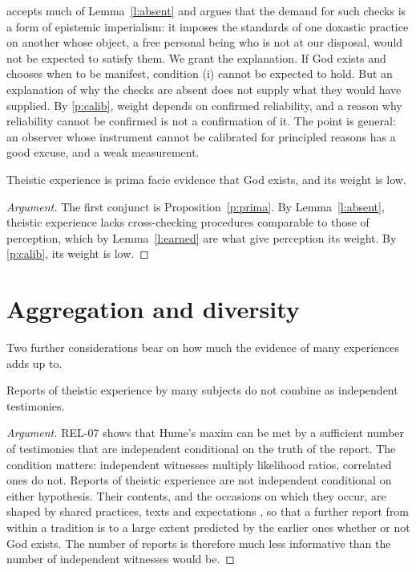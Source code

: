 \documentclass{situationist-preprint}
\begin{document}
\citet{Alston1991} accepts much of Lemma~\ref{l:absent} and argues that the demand for such checks is a form of epistemic imperialism: it imposes the standards of one doxastic practice on another whose object, a free personal being who is not at our disposal, would not be expected to satisfy them. We grant the explanation. If God exists and chooses when to be manifest, condition (i) cannot be expected to hold. But an explanation of why the checks are absent does not supply what they would have supplied. By \ref{p:calib}, weight depends on confirmed reliability, and a reason why reliability cannot be confirmed is not a confirmation of it. The point is general: an observer whose instrument cannot be calibrated for principled reasons has a good excuse, and a weak measurement.

\begin{theorem}\label{t:main}
Theistic experience is prima facie evidence that God exists, and its weight is low.
\end{theorem}

\begin{proof}[Argument]
The first conjunct is Proposition~\ref{p:prima}. By Lemma~\ref{l:absent}, theistic experience lacks cross-checking procedures comparable to those of perception, which by Lemma~\ref{l:earned} are what give perception its weight. By \ref{p:calib}, its weight is low.
\end{proof}

\section{Aggregation and diversity}

Two further considerations bear on how much the evidence of many experiences adds up to.

\begin{proposition}\label{p:agg}
Reports of theistic experience by many subjects do not combine as independent testimonies.
\end{proposition}

\begin{proof}[Argument]
REL-07 shows that Hume's maxim can be met by a sufficient number of testimonies that are independent conditional on the truth of the report. The condition matters: independent witnesses multiply likelihood ratios, correlated ones do not. Reports of theistic experience are not independent conditional on either hypothesis. Their contents, and the occasions on which they occur, are shaped by shared practices, texts and expectations \citep{Katz1978}, so that a further report from within a tradition is to a large extent predicted by the earlier ones whether or not God exists. The number of reports is therefore much less informative than the number of independent witnesses would be.
\end{proof}
\end{document}
